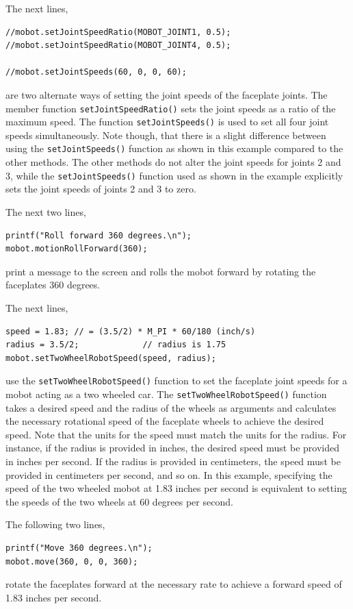 \documentclass{article}
\begin{document}
The next lines, 
\begin{verbatim}
//mobot.setJointSpeedRatio(MOBOT_JOINT1, 0.5);
//mobot.setJointSpeedRatio(MOBOT_JOINT4, 0.5);

//mobot.setJointSpeeds(60, 0, 0, 60);
\end{verbatim}
are two alternate ways of setting the joint speeds of the faceplate joints. 
The member function \texttt{setJointSpeedRatio()} sets the joint speeds as a ratio of the 
maximum speed. The function \texttt{setJointSpeeds()} is used to set all four
joint speeds simultaneously. Note though, that there is a slight difference between
using the \texttt{setJointSpeeds()} function as shown in this example compared to the
other methods. The other methods do not alter the joint speeds for joints 2 and 3, while
the \texttt{setJointSpeeds()} function used as shown in the example explicitly sets
the joint speeds of joints 2 and 3 to zero. 

The next two lines,
\begin{verbatim}
printf("Roll forward 360 degrees.\n");
mobot.motionRollForward(360);
\end{verbatim}
print a message to the screen and rolls the mobot forward by rotating the faceplates
360 degrees.

The next lines,
\begin{verbatim}
speed = 1.83; // = (3.5/2) * M_PI * 60/180 (inch/s)
radius = 3.5/2;             // radius is 1.75 
mobot.setTwoWheelRobotSpeed(speed, radius);
\end{verbatim}
use the \texttt{setTwoWheelRobotSpeed()} function to set the faceplate joint
speeds for a mobot acting as a two wheeled car. The
\texttt{setTwoWheelRobotSpeed()} function takes a desired speed
and the radius of the wheels as arguments and calculates the necessary
rotational speed of the faceplate wheels to achieve the desired speed. Note
that the units for the speed must match the units for the radius. For instance,
if the radius is provided in inches, the desired speed must be provided in 
inches per second. If the radius is provided in centimeters, the speed must
be provided in centimeters per second, and so on. In this example, specifying 
the speed of the two wheeled mobot at 1.83 inches per second is equivalent to setting
the speeds of the two wheels at 60 degrees per second.

The following two lines,
\begin{verbatim}
printf("Move 360 degrees.\n");
mobot.move(360, 0, 0, 360);
\end{verbatim}
rotate the faceplates forward at the necessary rate to achieve a forward speed of
1.83 inches per second.
\end{document}
